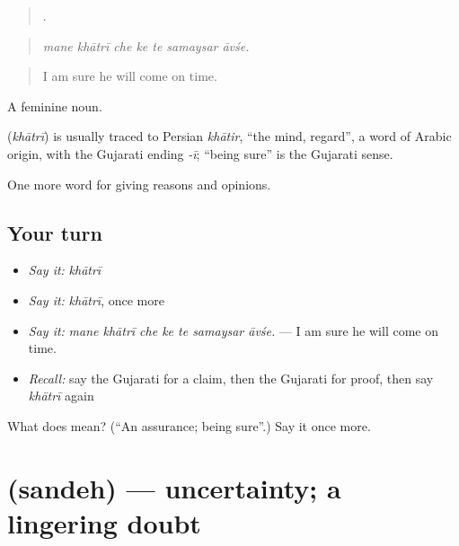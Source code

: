 \begin{quote}
      .
\end{quote}

\begin{quote}
\emph{mane khātrī che ke te samaysar āvśe.}
\end{quote}

\begin{quote}
I am sure he will come on time.
\end{quote}

A feminine noun.

\begin{cousinweb}
\textbf{} (\emph{khātrī}) is usually traced to Persian \emph{khātir}, \textquotedblleft{}the mind, regard\textquotedblright{}, a word of Arabic origin, with the Gujarati ending \emph{-ī}; \textquotedblleft{}being sure\textquotedblright{} is the Gujarati sense.
\end{cousinweb}

\begin{grammarlens}[title={What you've built}]
One more word for giving reasons and opinions.
\end{grammarlens}

\subsection*{Your turn}
\begin{itemize}
\raggedright
  \item \emph{Say it:} \emph{khātrī}
  \item \emph{Say it:} \emph{khātrī}, once more
  \item \emph{Say it:} \emph{mane khātrī che ke te samaysar āvśe.} — I am sure he will come on time.
  \item \emph{Recall:} say the Gujarati for a claim, then the Gujarati for proof, then say \emph{khātrī} again
\end{itemize}

\begin{tcolorbox}[breakable,colback=teal!4,colframe=teal!35!black,title={Before you move on}]
What does  mean? (\textquotedblleft{}An assurance; being sure\textquotedblright{}.) Say it once more.
\end{tcolorbox}
\section[\texorpdfstring{\gu{સંદેહ} (sandeh)}{સંદેહ (sandeh)}]{ (sandeh) — uncertainty; a lingering doubt}

